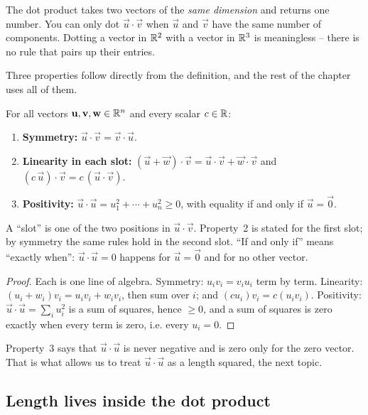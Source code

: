 \begin{focusbox}
The dot product takes two vectors of the \emph{same dimension} and returns one number.
You can only dot $\vec u\cdot\vec v$ when $\vec u$ and $\vec v$ have the same
number of components. Dotting a vector in $\mathbb{R}^2$ with a vector in $\mathbb{R}^3$ is
meaningless -- there is no rule that pairs up their entries.
\end{focusbox}

Three properties follow directly from the definition, and the rest of the chapter
uses all of them.

\begin{formalbox}
For all vectors $\mathbf{u}, \mathbf{v}, \mathbf{w} \in \mathbb{R}^n$ and every scalar $c\in\mathbb{R}$:
\begin{enumerate}
  \item \textbf{Symmetry:} $\vec u\cdot\vec v = \vec v\cdot\vec u$.
  \item \textbf{Linearity in each slot:}
        $(\vec u + \vec w)\cdot\vec v = \vec u\cdot\vec v + \vec w\cdot\vec v$
        and $(c\,\vec u)\cdot\vec v = c\,(\vec u\cdot\vec v)$.
  \item \textbf{Positivity:} $\vec u\cdot\vec u = u_1^2 + \cdots + u_n^2 \ge 0$,
        with equality if and only if $\vec u = \vec 0$.
\end{enumerate}
\end{formalbox}

A ``slot'' is one of the two positions in $\vec u\cdot\vec v$. Property~2 is
stated for the first slot; by symmetry the same rules hold in the second slot.
``If and only if'' means ``exactly when'': $\vec u\cdot\vec u=0$ happens for
$\vec u=\vec 0$ and for no other vector.

\begin{proof}
Each is one line of algebra. Symmetry: $u_iv_i = v_iu_i$ term by term.
Linearity: $(u_i+w_i)v_i = u_iv_i + w_iv_i$, then sum over $i$; and
$(cu_i)v_i = c(u_iv_i)$. Positivity: $\vec u\cdot\vec u = \sum_i u_i^2$ is a sum of
squares, hence $\ge 0$, and a sum of squares is zero exactly when every term is
zero, i.e. every $u_i=0$.
\end{proof}

Property~3 says that $\vec u\cdot\vec u$ is never negative and is zero only for the
zero vector. That is what allows us to treat $\vec u\cdot\vec u$ as a length
squared, the next topic.

\subsection{Length lives inside the dot product}

